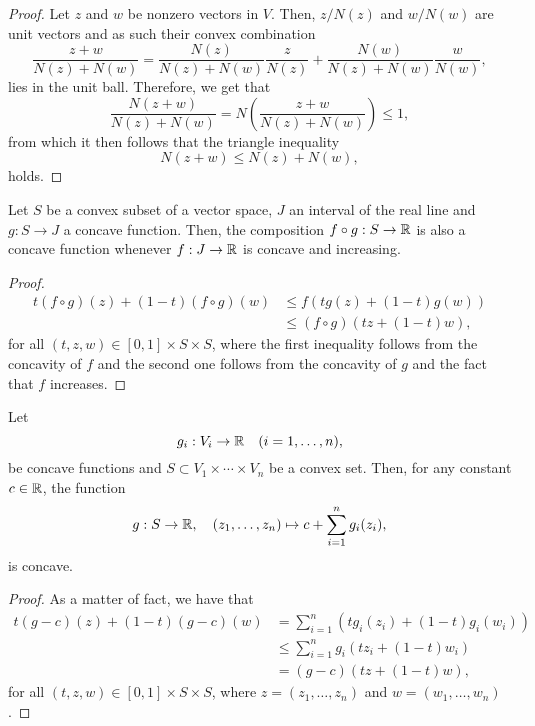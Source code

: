 \begin{proof}
  Let \(z\) and \(w\) be nonzero vectors in \(V\). Then, \(z/N(z)\) and
  \(w/N(w)\) are unit vectors and as such their convex combination
  \[
    \frac{z+w}{N(z)+N(w)}
    =
    \frac{N(z)}{N(z)+N(w)}\frac{z}{N(z)}
    +
    \frac{N(w)}{N(z)+N(w)}\frac{w}{N(w)}
    ,
  \]
  lies in the unit ball. Therefore, we get that
  \[
    \frac{N(z+w)}{N(z)+N(w)}
    =
    N\left(\frac{z+w}{N(z)+N(w)}\right)\leqslant{1},
  \]
  from which it then follows that the triangle inequality
  \[
    N(z+w)\leqslant{N(z)+N(w)},
  \]
  holds.
\end{proof}

\begin{lemma}\label{lemma:concavity-of-compositions-of-concave-functions}
  Let \(S\) be a convex subset of a vector space, \(J\) an interval of the real
  line and \(g:S\to{J}\) a concave function. Then, the composition
  \(f\circ{g}:S\to\mathbb{R}\) is also a concave function whenever \(f:J\to\mathbb{R}\)
  is concave and increasing.
\end{lemma}

\begin{proof}
  \begin{align*}
    t(f\circ{g})(z)+(1-t)(f\circ{g})(w)
    &\leqslant{f(tg(z)+(1-t)g(w))}\\
    &\leqslant{(f\circ{g})(tz+(1-t)w)},
  \end{align*}
  for all \((t,z,w)\in{[0,1]\times{S}\times{S}}\), where the first inequality
  follows from the concavity of \(f\) and the second one follows from the
  concavity of \(g\) and the fact that \(f\) increases.
\end{proof}

\begin{lemma}\label{lemma:concavity-of-sums-of-concave-functions}
  Let
  \[
    g_{i}:V_{i}\to\mathbb{R}\quad{\left(i=1,\ldots,n\right)},
  \]
  be concave functions and \(S\subset{V_{1}\times\cdots\times{V_{n}}}\) be a
  convex set. Then, for any constant \(c\in\mathbb{R}\), the function
  \[
    g:S\to\mathbb{R},\quad{(z_{1},\ldots,z_{n})\mapsto{c+\sum_{i=1}^{n}g_{i}(z_{i})}},
  \]
  is concave.
\end{lemma}

\begin{proof}
  As a matter of fact, we have that
  \begin{align*}
    t(g-c)(z)+(1-t)(g-c)(w)
    &=
    \sum_{i=1}^{n}\left(tg_{i}(z_{i})+(1-t)g_{i}(w_{i})\right)
    \\
    &\leqslant
    \sum_{i=1}^{n}g_{i}\left(tz_{i}+(1-t)w_{i}\right)
    \\
    &=
    (g-c)\left(tz+(1-t)w\right),
  \end{align*}
  for all \((t,z,w)\in{[0,1]\times{S}\times{S}}\), where
  \(z=(z_{1},\ldots,z_{n})\) and \(w=(w_{1},\ldots,w_{n})\).
\end{proof}

